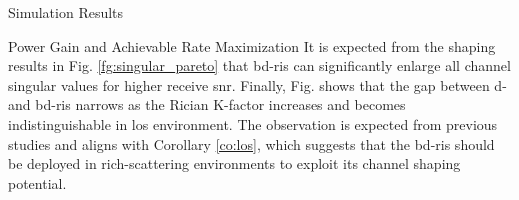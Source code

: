 \documentclass[journal]{IEEEtran}
\begin{document}
\begin{section}{Simulation Results}
\begin{subsection}{Power Gain and Achievable Rate Maximization}
	 It is expected from the shaping results in Fig. \ref{fg:singular_pareto} that \gls{bd}-\gls{ris} can significantly enlarge all channel singular values for higher receive \gls{snr}.
	 Finally, Fig.  shows that the gap between \gls{d}- and \gls{bd}-\gls{ris} narrows as the Rician K-factor increases and becomes indistinguishable in \gls{los} environment.
	 The observation is expected from previous studies \cite{Shen2020a,Li2023b,Nerini2023} and aligns with Corollary \ref{co:los}, which suggests that the \gls{bd}-\gls{ris} should be deployed in rich-scattering environments to exploit its channel shaping potential.
 \end{subsection}
\end{section}
\end{document}
